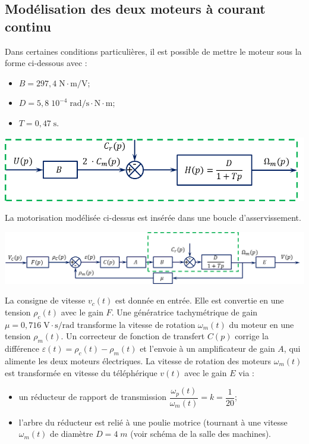 \documentclass[10pt]{article}
\newif\ifprof
\begin{document}
\subsection{Modélisation des deux moteurs à courant continu}
\ifprof
\else
\vspace{.25cm}

\begin{minipage}[c]{.4\linewidth}
Dans certaines conditions particulières, il est possible de mettre le moteur sous la forme ci-dessous avec :
\begin{itemize}
\item $B=297,4\; \text{N}\cdot \text{m⁄V}$;
\item $D=5,8\;10^{-4} \;  \text{rad⁄s}\cdot \text{N}\cdot\text{m}$;
\item $T=0,47\;\text{s}$.
\end{itemize}
\end{minipage}\hfill
\begin{minipage}[c]{.59\linewidth}
\begin{center}
\includegraphics[width=.9\textwidth]{images/SchemaBloc_02}
\end{center}
\end{minipage}

\vspace{.25cm}

La motorisation modélisée ci-dessus est insérée dans une boucle d’asservissement.

\begin{center}
\includegraphics[width=\textwidth]{images/SchemaBloc_03}
\end{center}


La consigne de vitesse $v_c(t)$ est donnée en entrée. Elle est convertie en une tension $\rho_c(t)$ avec le gain $F$. Une génératrice tachymétrique de gain $\mu =0,716 \; \text{V}\cdot \text{s/rad}$ transforme la vitesse de rotation $\omega_m(t)$ du moteur en une tension $\rho_m(t)$. Un correcteur de fonction de transfert $C(p)$ corrige la différence $\varepsilon (t)= \rho_c(t) -  \rho_m(t)$ et l’envoie à un amplificateur de gain $A$, qui alimente les deux moteurs électriques. La vitesse de rotation des moteurs $\omega_m(t)$ est transformée en vitesse du téléphérique $v(t)$ avec le gain $E$ via :
\begin{itemize}
\item un réducteur de rapport de transmission $\dfrac{\omega_p(t)}{\omega_m(t)} = k =\dfrac{1}{20}$;
\item l'arbre du réducteur
est relié à une poulie motrice (tournant à une vitesse $\omega_m(t)$ de diamètre $D=4\;m$ (voir schéma de la salle des machines).
\end{itemize}
\end{document}
